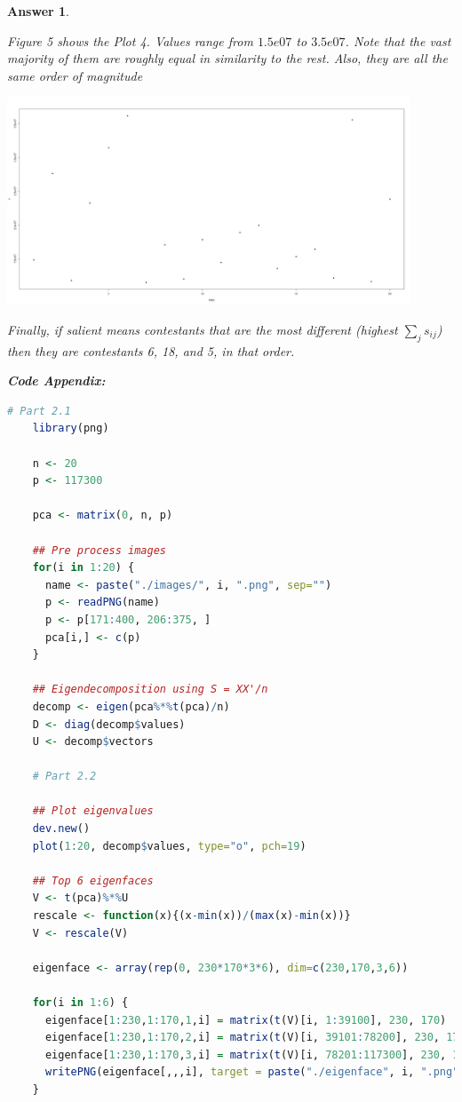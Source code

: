 \documentclass[12pt]{article}
\theoremstyle{colon}
\newtheorem*{answer}{Answer}
\begin{document}
\begin{answer}
\begin{enumerate}[label=\arabic*)]
      Figure 5 shows the Plot 4. Values range from $1.5e07$ to $3.5e07$. Note that the vast majority of them are roughly equal in similarity to the rest. Also, they are all the same order of magnitude
      \begin{center}
        \includegraphics[width=0.9\textwidth]{plot4.jpg}
      \end{center}

      Finally, if salient means contestants that are the most different (highest $\sum_j s_{ij}$) then they are contestants 6, 18, and 5, in that order.
  \end{enumerate}

  \textbf{Code Appendix:}

  \begin{lstlisting}[language=R, basicstyle=\scriptsize, breaklines=true]
    # Part 2.1
    library(png)

    n <- 20
    p <- 117300

    pca <- matrix(0, n, p)

    ## Pre process images
    for(i in 1:20) {
      name <- paste("./images/", i, ".png", sep="")
      p <- readPNG(name)
      p <- p[171:400, 206:375, ]
      pca[i,] <- c(p)
    }

    ## Eigendecomposition using S = XX'/n
    decomp <- eigen(pca%*%t(pca)/n)
    D <- diag(decomp$values)
    U <- decomp$vectors

    # Part 2.2

    ## Plot eigenvalues
    dev.new()
    plot(1:20, decomp$values, type="o", pch=19)

    ## Top 6 eigenfaces
    V <- t(pca)%*%U
    rescale <- function(x){(x-min(x))/(max(x)-min(x))}
    V <- rescale(V)

    eigenface <- array(rep(0, 230*170*3*6), dim=c(230,170,3,6))

    for(i in 1:6) {
      eigenface[1:230,1:170,1,i] = matrix(t(V)[i, 1:39100], 230, 170)
      eigenface[1:230,1:170,2,i] = matrix(t(V)[i, 39101:78200], 230, 170)
      eigenface[1:230,1:170,3,i] = matrix(t(V)[i, 78201:117300], 230, 170)
      writePNG(eigenface[,,,i], target = paste("./eigenface", i, ".png", sep=""))
    }


\end{lstlisting}
\end{answer}
\end{document}
